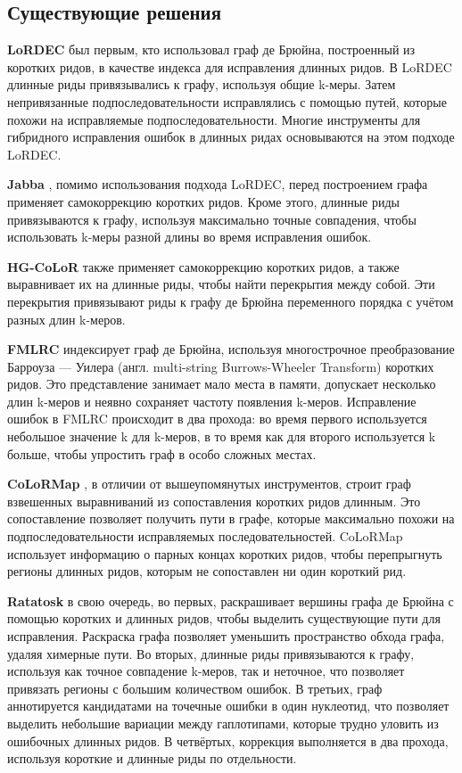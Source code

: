 \documentclass[14pt]{matmex-diploma-custom}
\begin{document}

\subsection{Существующие решения}
\textbf{LoRDEC} \cite{art:salmela2014lordec} был первым, кто использовал граф де Брюйна, построенный из коротких ридов, в качестве индекса для исправления длинных ридов. В LoRDEC длинные риды привязывались к графу, используя общие k-меры. Затем непривязанные подпоследовательности исправлялись с помощью путей, которые похожи на исправляемые подпоследовательности. Многие инструменты для гибридного исправления ошибок в длинных ридах основываются на этом подходе LoRDEC.

\textbf{Jabba} \cite{art:miclotte2016jabba}, помимо использования подхода LoRDEC, перед построением графа применяет самокоррекцию коротких ридов. Кроме этого, длинные риды привязываются к графу, используя максимально точные совпадения, чтобы использовать k-меры разной длины во время исправления ошибок.

\textbf{HG-CoLoR} \cite{art:morisse2018hybrid} также применяет самокоррекцию коротких ридов, а также выравнивает их на длинные риды, чтобы найти перекрытия между собой. Эти перекрытия привязывают риды к графу де Брюйна переменного порядка с учётом разных длин k-меров.

\textbf{FMLRC} \cite{art:wang2018fmlrc} индексирует граф де Брюйна, используя многострочное преобразование Барроуза — Уилера (англ. multi-string Burrows-Wheeler Transform) коротких ридов. Это представление занимает мало места в памяти, допускает несколько длин k-меров и неявно сохраняет частоту появления k-меров. Исправление ошибок в FMLRC происходит в два прохода: во время первого используется небольшое значение k для k-меров, в то время как для второго используется k больше, чтобы упростить граф в особо сложных местах.

\textbf{CoLoRMap} \cite{art:haghshenas2016colormap}, в отличии от вышеупомянутых инструментов, строит граф взвешенных выравниваний из сопоставления коротких ридов длинным. Это сопоставление позволяет получить пути в графе, которые максимально похожи на подпоследовательности исправляемых последовательностей. CoLoRMap использует информацию о парных концах коротких ридов, чтобы перепрыгнуть регионы длинных ридов, которым не сопоставлен ни один короткий рид.

\textbf{Ratatosk} \cite{art:holley2021ratatosk} в свою очередь, во первых, раскрашивает вершины графа де Брюйна с помощью коротких и длинных ридов, чтобы выделить существующие пути для исправления. Раскраска графа позволяет уменьшить пространство обхода графа, удаляя химерные пути.
Во вторых, длинные риды привязываются к графу, используя как точное совпадение k-меров, так и неточное, что позволяет привязать регионы с большим количеством ошибок. В третьих, граф аннотируется кандидатами на точечные ошибки в один нуклеотид, что позволяет выделить небольшие вариации между гаплотипами, которые трудно уловить из ошибочных длинных ридов. В четвёртых, коррекция выполняется в два прохода, используя короткие и длинные риды по отдельности.
\end{document}
